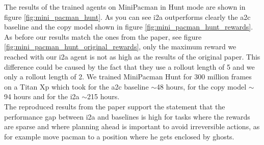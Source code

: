 The results of the trained agents on MiniPacman in Hunt mode are shown in figure \ref{fig:mini_pacman_hunt}. As you can see i2a outperforms clearly the a2c baseline and the copy model shown in figure \ref{fig:mini_pacman_hunt_rewards}.
As before our results match the ones from the paper, see figure \ref{fig:mini_pacman_hunt_original_rewards}, only the maximum reward we reached with our i2a agent is not as high as the results of the original paper.
This difference could be caused by the fact that they use a rollout length of 5 and we only a rollout length of 2.
We trained MiniPacman Hunt for 300 million frames on a Titan Xp  which took for the a2c baseline $\sim$48 hours, for the copy model $\sim$94 hours and for the i2a $\sim$215 hours.\\ 


The reproduced results from the paper support the statement that the performance gap between i2a and baselines is high for tasks where the rewards are sparse and where planning ahead is important to avoid irreversible actions, as for example move pacman to a position where he gets enclosed by ghosts.






